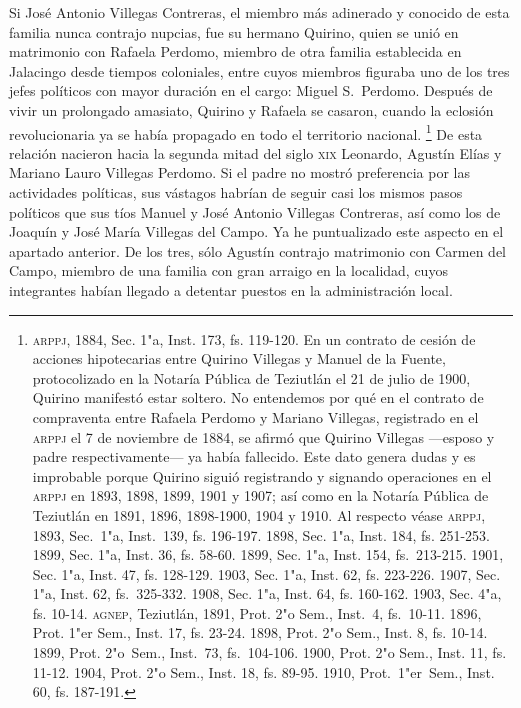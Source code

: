 \documentclass[14pt,twoside,final]{extbook} %
\let\oldfootnote\footnote
\renewcommand\footnote[1]{%
\oldfootnote{\hspace{1mm}#1}}
\begin{document}
Si José Antonio Villegas Contreras, el miembro más adinerado y conocido de esta familia nunca contrajo nupcias, fue su hermano Quirino, quien se unió en matrimonio con Rafaela Perdomo, miembro de otra familia establecida en Jalacingo desde tiempos coloniales, entre cuyos miembros figuraba uno de los tres jefes políticos con mayor duración en el cargo: Miguel S.~Perdomo. Después de vivir un prolongado amasiato, Quirino y Rafaela se casaron, cuando la eclosión revolucionaria ya se había
propagado en todo el territorio nacional.\footnote{\textsc{arppj}, 1884, Sec. 1"a, Inst. 173, fs. 119-120. En un contrato de cesión de acciones hipotecarias entre Quirino Villegas y Manuel de la Fuente, protocolizado en la Notaría Pública de Teziutlán el 21 de julio de 1900, Quirino manifestó estar soltero. No entendemos por qué en el contrato de compraventa entre Rafaela Perdomo y Mariano Villegas, registrado en el \textsc{arppj} el 7 de noviembre de 1884, se afirmó que Quirino Villegas ---esposo y padre respectivamente--- ya había fallecido. Este dato genera dudas y es improbable porque Quirino siguió registrando y signando operaciones en el \textsc{arppj} en 1893, 1898, 1899, 1901 y 1907; así como en la Notaría Pública de Teziutlán en 1891, 1896, 1898-1900, 1904 y 1910. Al respecto véase \textsc{arppj}, 1893, Sec.~1"a, Inst.~139, fs. 196-197. 1898, Sec. 1"a, Inst. 184, fs. 251-253. 1899, Sec. 1"a, Inst. 36, fs. 58-60. 1899, Sec. 1"a, Inst. 154, fs.~213-215. 1901, Sec. 1"a, Inst. 47, fs. 128-129. 1903, Sec. 1"a, Inst. 62, fs. 223-226. 1907, Sec. 1"a, Inst. 62, fs.~325-332. 1908, Sec. 1"a, Inst. 64, fs. 160-162. 1903, Sec. 4"a, fs. 10-14. \textsc{agnep}, Teziutlán, 1891, Prot. 2"o Sem., Inst.~4, fs.~10-11. 1896, Prot. 1"er Sem., Inst. 17, fs. 23-24. 1898, Prot. 2"o Sem., Inst. 8, fs. 10-14. 1899, Prot. 2"o~Sem., Inst.~73, fs.~104-106. 1900, Prot. 2"o Sem., Inst. 11, fs. 11-12. 1904, Prot. 2"o Sem., Inst. 18, fs. 89-95. 1910, Prot.~1"er~Sem., Inst. 60, fs. 187-191.} De esta relación nacieron hacia la segunda mitad del siglo \textsc{xix} Leonardo, Agustín Elías y Mariano Lauro Villegas Perdomo. Si el padre no mostró preferencia por las actividades políticas, sus vástagos habrían de seguir casi los mismos pasos políticos que sus tíos Manuel y José Antonio Villegas Contreras, así como los de Joaquín y José María Villegas del Campo. Ya he puntualizado este aspecto en el apartado anterior. De los tres, sólo Agustín contrajo matrimonio con Carmen del Campo, miembro de una familia con gran arraigo en la localidad, cuyos integrantes habían llegado a detentar puestos en la administración local.
\end{document}
